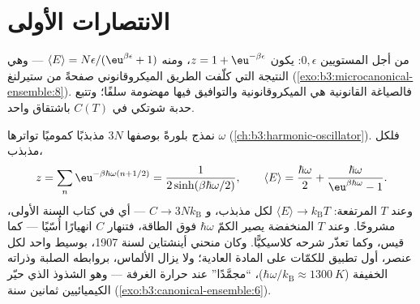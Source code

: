 \section{الانتصارات الأولى}

\begin{example}\label{ex:b3:canonical-ensemble:twolevel}
من أجل المستويين $0, \epsilon$: يكون $z = 1 + \eu^{-\beta\epsilon}$، ومنه
$\langle E\rangle = N\epsilon/(\eu^{\beta\epsilon} + 1)$ --- وهي
النتيجة التي كلّفت الطريق الميكروقانوني صفحةً من ستيرلنغ
(\cref{exo:b3:microcanonical-ensemble:8}). فالصياغة القانونية
هي الميكروقانونية والتوافيق فيها مهضومة سلفًا؛ وتتبع
حدبة شوتكي في $C(T)$ باشتقاق واحد.
\end{example}

\begin{example}\label{ex:b3:canonical-ensemble:einstein}
نمذج بلورةً بوصفها $3N$ مذبذبًا كموميًا تواترها $\omega$
(\cref{ch:b3:harmonic-oscillator}). فلكل مذبذب،
\[
z = \sum_n\eu^{-\beta\hbar\omega(n + 1/2)}
 = \frac{1}{2\sinh(\beta\hbar\omega/2)} , \qquad
\langle E\rangle = \frac{\hbar\omega}{2} +
\frac{\hbar\omega}{\eu^{\beta\hbar\omega} - 1} .
\]
وعند $T$ المرتفعة: $\langle E\rangle \to k_{\text{B}}T$ لكل مذبذب،
و $C \to 3Nk_{\text{B}}$ --- أي  في كتاب السنة
الأولى، مشروحًا. وعند $T$ المنخفضة يصير الكمّ $\hbar\omega$
فوق الطاقة، فتنهار $C$ انهيارًا أُسّيًا --- كما قيس، وكما
تعذّر شرحه كلاسيكيًّا. وكان منحني أينشتاين لسنة 1907، بوسيط واحد لكل
عنصر، أول تطبيق للكمّات على المادة العادية؛
ولا يزال الألماس، بروابطه الصلبة وذراته الخفيفة ($\hbar\omega/k_{\text{B}}
\approx \qty{1300}{K}$)، ``مجمَّدًا'' عند حرارة الغرفة ---
وهو الشذوذ الذي حيّر الكيميائيين ثمانين سنة
(\cref{exo:b3:canonical-ensemble:6}).
\end{example}

